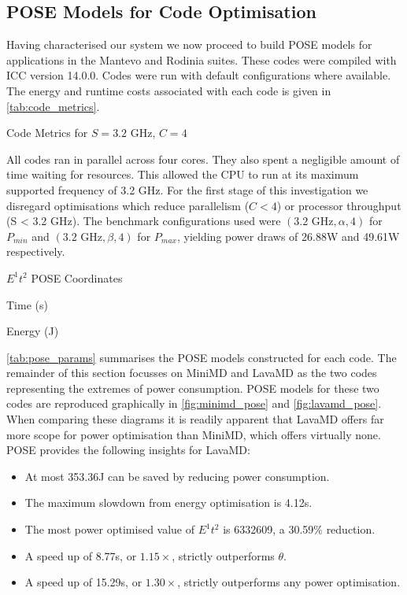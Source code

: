 \subsection{POSE Models for Code Optimisation}
Having characterised our system we now proceed to build POSE models for applications in the Mantevo and Rodinia suites.
These codes were compiled with ICC version 14.0.0.
Codes were run with default configurations where available.
The energy and runtime costs associated with each code is given in \autoref{tab:code_metrics}.

\begin{table}
  \scriptsize
  \centering
  \caption{Code Metrics for $S = 3.2\text{ GHz}$, $C = 4$}
  \label{tab:code_metrics}
  
\end{table}

All codes ran in parallel across four cores.
They also spent a negligible amount of time waiting for resources. 
This allowed the CPU to run at its maximum supported frequency of 3.2 GHz.
For the first stage of this investigation we disregard optimisations which reduce parallelism ($C < 4$) or processor throughput (S < 3.2 GHz).
The benchmark configurations used were $(\text{3.2 GHz}, \alpha, 4)$ for $P_{min}$ and $(\text{3.2 GHz}, \beta, 4)$ for $P_{max}$, yielding power draws of 26.88W and 49.61W respectively.

\begin{table}
  \setlength{\tabcolsep}{.5em}
  \scriptsize
  \caption{$E^1t^2$ POSE Coordinates}
  \begin{subtable}{\linewidth}
  \centering
  \caption{Time (s)}
  
  \end{subtable}
  \begin{subtable}{\linewidth}
  \centering
  \caption{Energy (J)}
  
  \end{subtable}
  \label{tab:pose_params}
\end{table}

\autoref{tab:pose_params} summarises the POSE models constructed for each code.
The remainder of this section focusses on MiniMD and LavaMD as the two codes representing the extremes of power consumption.
POSE models for these two codes are reproduced graphically in \autoref{fig:minimd_pose} and \autoref{fig:lavamd_pose}.
When comparing these diagrams it is readily apparent that LavaMD offers far more scope for power optimisation than MiniMD, which offers virtually none. 
POSE provides the following insights for LavaMD:
\begin{itemize}
  \item At most 353.36J can be saved by reducing power consumption.
  \item The maximum slowdown from energy optimisation is 4.12s.
  \item The most power optimised value of $E^1t^2$ is 6332609, a 30.59\% reduction.
  \item A speed up of 8.77s, or $1.15 \times$, strictly outperforms $\theta$.
  \item A speed up of 15.29s, or $1.30 \times$, strictly outperforms any power optimisation.
\end{itemize}

